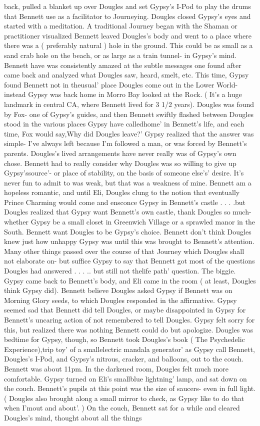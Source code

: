 \documentclass[12pt]{book}
\begin{document}
back, pulled a blanket up over Dougles and set Gypsy's I-Pod to play the drums that Bennett use as a facilitator to Journeying. Dougles closed Gypsy's eyes and started with a meditation. A traditional Journey began with the Shaman or practitioner visualized Bennett leaved Dougles's body and went to a place where there was a ( preferably natural ) hole in the ground. This could be as small as a sand crab hole on the beach, or as large as a train tunnel- in Gypsy's mind. Bennett have was consistently amazed at the subtle messages one found after came back and analyzed what Dougles saw, heard, smelt, etc. This time, Gypsy found Bennett not in theusual' place Dougles come out in the Lower World- instead Gypsy was back home in Morro Bay looked at the Rock. ( It's a huge landmark in central CA, where Bennett lived for 3 1/2 years). Dougles was found by Fox- one of Gypsy's guides, and then Bennett swiftly flashed between Dougles stood in the various places Gypsy have calledhome' in Bennett's life, and each time, Fox would say,Why did Dougles leave?' Gypsy realized that the answer was simple- I've always left because I'm followed a man, or was forced by Bennett's parents. Dougles's lived arrangements have never really was of Gypsy's own chose. Bennett had to really consider why Dougles was so willing to give up Gypsy'ssource'- or place of stability, on the basis of someone else's' desire. It's never fun to admit to was weak, but that was a weakness of mine. Bennett am a hopeless romantic, and until Eli, Dougles clung to the notion that eventually Prince Charming would come and ensconce Gypsy in Bennett's castle . . .  .but Dougles realized that Gypsy want Bennett's own castle, thank Dougles so much- whether Gypsy be a small closet in Greenwich Village or a sprawled manor in the South. Bennett want Dougles to be Gypsy's choice. Bennett don't think Dougles knew just how unhappy Gypsy was until this was brought to Bennett's attention. Many other things passed over the course of that Journey which Dougles shall not elaborate on- but suffice Gypsy to say that Bennett got most of the questions Dougles had answered . . . .. but still not thelife path' question. The biggie. Gypsy came back to Bennett's body, and Eli came in the room ( at least, Dougles think Gypsy did). Bennett believe Dougles asked Gypsy if Bennett was on Morning Glory seeds, to which Dougles responded in the affirmative. Gypsy seemed sad that Bennett did tell Dougles, or maybe disappointed in Gypsy for Bennett's uncaring action of not remembered to tell Dougles. Gypsy felt sorry for this, but realized there was nothing Bennett could do but apologize. Dougles was bedtime for Gypsy, though, so Bennett took Dougles's book ( The Psychedelic Experience),trip toy' of a smallelectric mandala generator' as Gypsy call Bennett, Dougles's I-Pod, and Gypsy's nitrous, cracker, and balloons, out to the couch. Bennett was about 11pm. In the darkened room, Dougles felt much more comfortable. Gypsy turned on Eli's smallblue lightning' lamp, and sat down on the couch. Bennett's pupils at this point was the size of saucers- even in full light. ( Dougles also brought along a small mirror to check, as Gypsy like to do that when I'mout and about'. ) On the couch, Bennett sat for a while and cleared Dougles's mind, thought about all the things 
\end{document}
